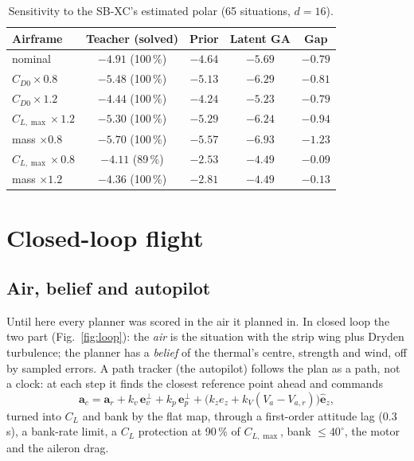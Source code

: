 \documentclass[11pt,a4paper,oneside]{report}
\newcommand{\vect}[1]{\boldsymbol{#1}}
\newcommand{\CL}{C_L}
\newcommand{\CLmax}{C_{L,\max}}
\begin{document}
\begin{table}[ht]\centering\small
\caption{Sensitivity to the SB-XC's estimated polar (65 situations, $d=16$).}\label{tab:sens}
\begin{tabular}{@{}lcccc@{}}
\toprule
Airframe & Teacher (solved) & Prior & Latent GA & Gap \\ \midrule
nominal & $-4.91$ (100\,\%) & $-4.64$ & $-5.69$ & $-0.79$ \\
$C_{D0}\times0.8$ & $-5.48$ (100\,\%) & $-5.13$ & $-6.29$ & $-0.81$ \\
$C_{D0}\times1.2$ & $-4.44$ (100\,\%) & $-4.24$ & $-5.23$ & $-0.79$ \\
$\CLmax\times1.2$ & $-5.30$ (100\,\%) & $-5.29$ & $-6.24$ & $-0.94$ \\
mass $\times0.8$ & $-5.70$ (100\,\%) & $-5.57$ & $-6.93$ & $-1.23$ \\
$\CLmax\times0.8$ & $-4.11$ (89\,\%) & $-2.53$ & $-4.49$ & $-0.09$ \\
mass $\times1.2$ & $-4.36$ (100\,\%) & $-2.81$ & $-4.49$ & $-0.13$ \\
\bottomrule
\end{tabular}
\end{table}

\chapter{Closed-loop flight}\label{ch:closedloop}

\section{Air, belief and autopilot}
Until here every planner was scored in the air it planned in. In closed loop the two part (Fig.~\ref{fig:loop}): the \emph{air} is the situation with the strip wing plus Dryden turbulence; the planner has a \emph{belief} of the thermal's centre, strength and wind, off by sampled errors. A path tracker (the autopilot) follows the plan as a path, not a clock: at each step it finds the closest reference point ahead and commands
\begin{equation}
\vect a_c = \vect a_r + k_v\,\vect e_v^\perp + k_p\,\vect e_p^\perp + \big(k_z e_z + k_V (V_a - V_{a,r})\big)\hat{\vect e}_z,
\end{equation}
turned into $\CL$ and bank by the flat map, through a first-order attitude lag (0.3\,s), a bank-rate limit, a $\CL$ protection at 90\,\% of $\CLmax$, bank $\le 40^\circ$, the motor and the aileron drag.
\end{document}

